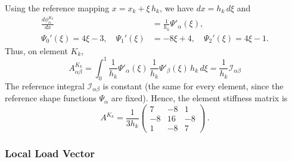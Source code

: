 \documentclass[a4paper,10pt]{article}
\begin{document}
Using the reference mapping \(x = x_k + \xi\,h_k\), we have \(dx = h_k\,d\xi\) and
\begin{align*}
	\frac{d\phi_{\alpha}^{K_k}}{dx}        & = \frac{1}{h_k}\Psi'_\alpha(\xi),   \\
	\Psi_0'(\xi)=4\xi-3,\quad \Psi_1'(\xi) & =-8\xi+4,\quad \Psi_2'(\xi)=4\xi-1.
\end{align*}
Thus, on element \(K_k\),
\[
	A^{K_k}_{\alpha\beta} = \int_{0}^{1} \frac{1}{h_k}\Psi'_\alpha(\xi)\,\frac{1}{h_k}\Psi'_\beta(\xi)\,h_k\,d\xi
	= \frac{1}{h_k} \mathcal{I}_{\alpha\beta}
\]
The reference integral \(\mathcal{I}_{\alpha\beta}\) is constant (the same for every element, since the reference shape functions \(\Psi_\alpha\) are fixed).
Hence, the element stiffness matrix is
\[
	A^{K_k} = \frac{1}{3h_k}
	\begin{pmatrix}
		7  & -8 & 1  \\
		-8 & 16 & -8 \\
		1  & -8 & 7
	\end{pmatrix}\,.
\]

\subsubsection{Local Load Vector}
\end{document}
